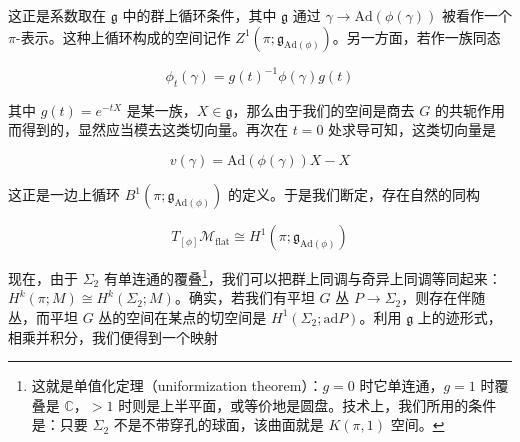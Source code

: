 

这正是系数取在 $\mathfrak{g}$ 中的群上循环条件，其中 $\mathfrak{g}$ 通过 $\gamma\to\mathrm{Ad}(\phi(\gamma))$ 被看作一个 $\pi$-表示。这种上循环构成的空间记作 $Z^{1}(\pi;\mathfrak{g}_{\mathrm{Ad}(\phi)})$。另一方面，若作一族同态

\begin{equation}
  \phi_t(\gamma)=g(t)^{-1}\phi(\gamma)g(t)
  \tag{2.124}
  \label{eq:2.124}
\end{equation}

其中 $g(t)=e^{-tX}$ 是某一族，$X\in\mathfrak{g}$，那么由于我们的空间是商去 $G$ 的共轭作用而得到的，显然应当模去这类切向量。再次在 $t=0$ 处求导可知，这类切向量是

\begin{equation}
  v(\gamma)=\mathrm{Ad}(\phi(\gamma))X-X
  \tag{2.125}
  \label{eq:2.125}
\end{equation}

这正是一边上循环 $B^{1}(\pi;\mathfrak{g}_{\mathrm{Ad}(\phi)})$ 的定义。于是我们断定，存在自然的同构

\begin{equation}
  T_{[\phi]}\mathcal{M}_{\mathrm{flat}}\cong H^{1}(\pi;\mathfrak{g}_{\mathrm{Ad}(\phi)})
  \tag{2.126}
  \label{eq:2.126}
\end{equation}

现在，由于 $\Sigma_2$ 有单连通的覆叠\footnote{这就是单值化定理（uniformization theorem）：$g=0$ 时它单连通，$g=1$ 时覆叠是 $\mathbb{C}$，$>1$ 时则是上半平面，或等价地是圆盘。技术上，我们所用的条件是：只要 $\Sigma_2$ 不是不带穿孔的球面，该曲面就是 $K(\pi,1)$ 空间。}，我们可以把群上同调与奇异上同调等同起来：$H^{k}(\pi;M)\cong H^{k}(\Sigma_2;M)$。确实，若我们有平坦 $G$ 丛 $P\to\Sigma_2$，则存在伴随丛，而平坦 $G$ 丛的空间在某点的切空间是 $H^{1}(\Sigma_2;\mathrm{ad}P)$。利用 $\mathfrak{g}$ 上的迹形式，相乘并积分，我们便得到一个映射

